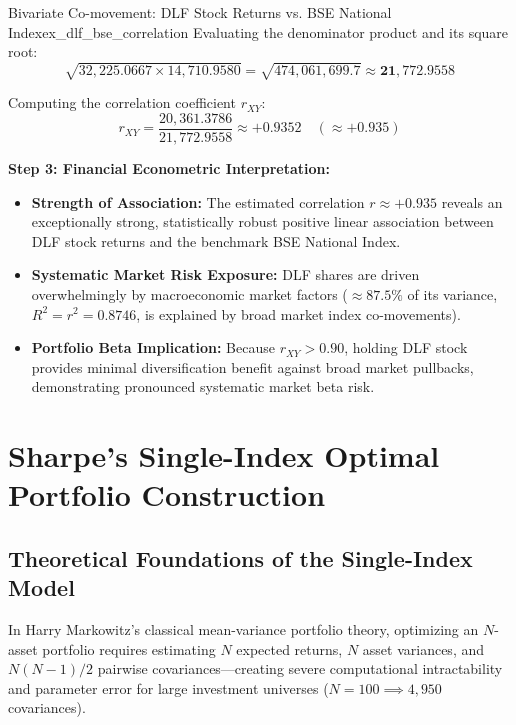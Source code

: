 \begin{example}{Bivariate Co-movement: DLF Stock Returns vs. BSE National Index}{ex_dlf_bse_correlation}
Evaluating the denominator product and its square root:
\begin{equation*}
    \sqrt{32{,}225.0667 \times 14{,}710.9580} = \sqrt{474{,}061{,}699.7} \approx \mathbf{21{,}772.9558}
\end{equation*}

Computing the correlation coefficient $r_{XY}$:
\begin{equation*}
    r_{XY} = \frac{20{,}361.3786}{21{,}772.9558} \approx \mathbf{+0.9352} \quad (\approx \mathbf{+0.935})
\end{equation*}

\tcbline
\textbf{Step 3: Financial Econometric Interpretation:}
\begin{itemize}[leftmargin=*, noitemsep]
    \item \textbf{Strength of Association:} The estimated correlation $r \approx +0.935$ reveals an exceptionally strong, statistically robust positive linear association between DLF stock returns and the benchmark BSE National Index.
    \item \textbf{Systematic Market Risk Exposure:} DLF shares are driven overwhelmingly by macroeconomic market factors ($\approx 87.5\%$ of its variance, $R^2 = r^2 = 0.8746$, is explained by broad market index co-movements).
    \item \textbf{Portfolio Beta Implication:} Because $r_{XY} > 0.90$, holding DLF stock provides minimal diversification benefit against broad market pullbacks, demonstrating pronounced systematic market beta risk.
\end{itemize}
\end{example}

\newpage
\section{Sharpe's Single-Index Optimal Portfolio Construction}

\subsection{Theoretical Foundations of the Single-Index Model}
In Harry Markowitz's classical mean-variance portfolio theory, optimizing an $N$-asset portfolio requires estimating $N$ expected returns, $N$ asset variances, and $N(N-1)/2$ pairwise covariances—creating severe computational intractability and parameter error for large investment universes ($N = 100 \implies 4{,}950$ covariances). 

